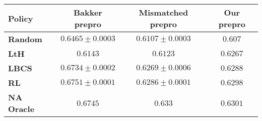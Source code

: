 \begin{tabular}{lccc}
 \toprule
\textbf{Policy}& Bakker prepro  & Mismatched prepro & Our prepro\\
\midrule
\textbf{Random} & $0.6465\pm 0.0003$ &  $0.6107\pm 0.0003$ & $0.607$\\
\textbf{LtH} & $0.6143$ & $0.6123$ & $0.6267$\\
\textbf{LBCS} & $0.6734 \pm 0.0002$ & $0.6269 \pm 0.0006$ & $0.6288$\\
\textbf{RL} & $\mathbf{0.6751\pm 0.0001}$& $\mathbf{0.6286 \pm 0.0001}$ &$\mathbf{0.6298}$\\
\midrule
\textbf{NA Oracle} & $0.6745$ & $0.633$& $0.6301$\\

\bottomrule
\end{tabular}
      